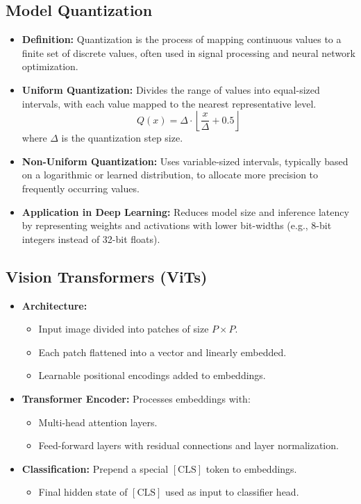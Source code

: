 \documentclass[12pt,a4paper]{article}
\begin{document}
\begin{itemize}
\subsection{Model Quantization}
\begin{itemize}
    \item \textbf{Definition:} Quantization is the process of mapping continuous values to a finite set of discrete values, often used in signal processing and neural network optimization.
    \item \textbf{Uniform Quantization:} Divides the range of values into equal-sized intervals, with each value mapped to the nearest representative level.
    \[
    Q(x) = \Delta \cdot \left\lfloor \frac{x}{\Delta} + 0.5 \right\rfloor
    \]
    where \( \Delta \) is the quantization step size.
    \item \textbf{Non-Uniform Quantization:} Uses variable-sized intervals, typically based on a logarithmic or learned distribution, to allocate more precision to frequently occurring values.
    \item \textbf{Application in Deep Learning:} Reduces model size and inference latency by representing weights and activations with lower bit-widths (e.g., 8-bit integers instead of 32-bit floats).
\end{itemize}
\end{itemize}
\subsection{Vision Transformers (ViTs)}
\begin{itemize}
    \item \textbf{Architecture:}
    \begin{itemize}
        \item Input image divided into patches of size $P \times P$.
        \item Each patch flattened into a vector and linearly embedded.
        \item Learnable positional encodings added to embeddings.
    \end{itemize}
    \item \textbf{Transformer Encoder:} Processes embeddings with:
    \begin{itemize}
        \item Multi-head attention layers.
        \item Feed-forward layers with residual connections and layer normalization.
    \end{itemize}
    \item \textbf{Classification:} Prepend a special $[\text{CLS}]$ token to embeddings.
    \begin{itemize}
        \item Final hidden state of $[\text{CLS}]$ used as input to classifier head.
    \end{itemize}
\end{itemize}
\end{document}
